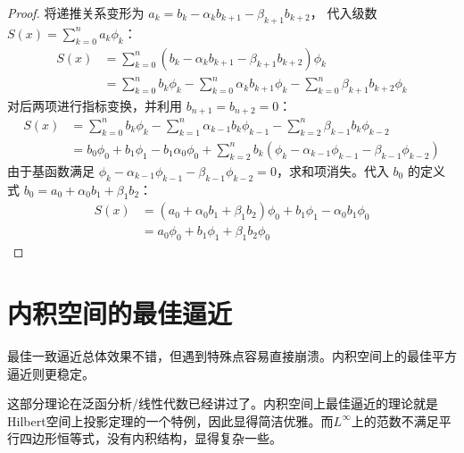 \begin{proof}
    将递推关系变形为 \(a_k = b_k - \alpha_k b_{k+1} - \beta_{k+1} b_{k+2}\)，
    代入级数 \(S(x) = \sum_{k=0}^n a_k \phi_k\)：
    \begin{align*}
        S(x) &= \sum_{k=0}^n (b_k - \alpha_k b_{k+1} - \beta_{k+1}
        b_{k+2}) \phi_k \\
        &= \sum_{k=0}^n b_k \phi_k - \sum_{k=0}^n \alpha_k b_{k+1}
        \phi_k - \sum_{k=0}^n \beta_{k+1} b_{k+2} \phi_k
    \end{align*}
    对后两项进行指标变换，并利用 \(b_{n+1} = b_{n+2} = 0\)：
    \begin{align*}
        S(x) &= \sum_{k=0}^n b_k \phi_k - \sum_{k=1}^n \alpha_{k-1}
        b_k \phi_{k-1} - \sum_{k=2}^n \beta_{k-1} b_k \phi_{k-2} \\
        &= b_0 \phi_0 + b_1 \phi_1 - b_1 \alpha_0 \phi_0 +
        \sum_{k=2}^n b_k (\phi_k - \alpha_{k-1} \phi_{k-1} -
        \beta_{k-1} \phi_{k-2})
    \end{align*}
    由于基函数满足 \(\phi_k - \alpha_{k-1} \phi_{k-1} - \beta_{k-1}
    \phi_{k-2} = 0\)，求和项消失。代入 \(b_0\) 的定义式 \(b_0 = a_0 + \alpha_0 b_1
    + \beta_1 b_2\)：
    \begin{align*}
        S(x) &= (a_0 + \alpha_0 b_1 + \beta_1 b_2) \phi_0 + b_1
        \phi_1 - \alpha_0 b_1 \phi_0 \\
        &= a_0 \phi_0 + b_1 \phi_1 + \beta_1 b_2 \phi_0
    \end{align*}
\end{proof}
\section{内积空间的最佳逼近}
最佳一致逼近总体效果不错，但遇到特殊点容易直接崩溃。内积空间上的最佳平方逼近则更稳定。

这部分理论在泛函分析/线性代数已经讲过了。内积空间上最佳逼近的理论就是Hilbert空间上投影定理的一个特例，因此显得简洁优雅。而\(L^{\infty }
\)上的范数不满足平行四边形恒等式，没有内积结构，显得复杂一些。

